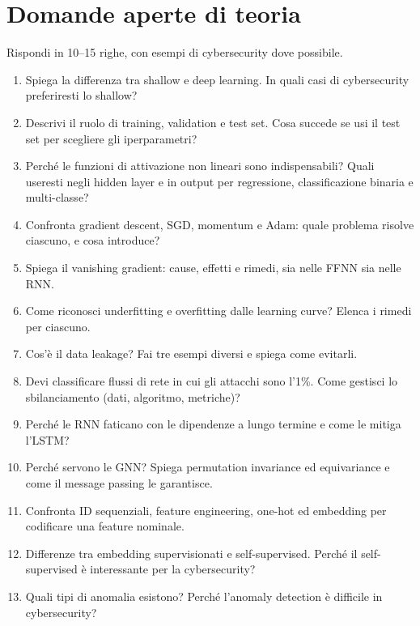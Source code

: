 \section{Domande aperte di teoria}
Rispondi in 10--15 righe, con esempi di cybersecurity dove possibile.
\begin{enumerate}[label=\textbf{A\arabic*.},ref=A\arabic*,leftmargin=2.6em,itemsep=6pt]

  \item\label{es:a1} Spiega la differenza tra shallow e deep learning. In quali casi di cybersecurity preferiresti lo shallow?
  \item\label{es:a2} Descrivi il ruolo di training, validation e test set. Cosa succede se usi il test set per scegliere gli iperparametri?
  \item\label{es:a3} Perché le funzioni di attivazione non lineari sono indispensabili? Quali useresti negli hidden layer e in output per regressione, classificazione binaria e multi-classe?
  \item\label{es:a4} Confronta gradient descent, SGD, momentum e Adam: quale problema risolve ciascuno, e cosa introduce?
  \item\label{es:a5} Spiega il vanishing gradient: cause, effetti e rimedi, sia nelle FFNN sia nelle RNN.
  \item\label{es:a6} Come riconosci underfitting e overfitting dalle learning curve? Elenca i rimedi per ciascuno.
  \item\label{es:a7} Cos'è il data leakage? Fai tre esempi diversi e spiega come evitarli.
  \item\label{es:a8} Devi classificare flussi di rete in cui gli attacchi sono l'1\%. Come gestisci lo sbilanciamento (dati, algoritmo, metriche)?
  \item\label{es:a9} Perché le RNN faticano con le dipendenze a lungo termine e come le mitiga l'LSTM?
  \item\label{es:a10} Perché servono le GNN? Spiega permutation invariance ed equivariance e come il message passing le garantisce.
  \item\label{es:a11} Confronta ID sequenziali, feature engineering, one-hot ed embedding per codificare una feature nominale.
  \item\label{es:a12} Differenze tra embedding supervisionati e self-supervised. Perché il self-supervised è interessante per la cybersecurity?
  \item\label{es:a13} Quali tipi di anomalia esistono? Perché l'anomaly detection è difficile in cybersecurity?

\end{enumerate}

